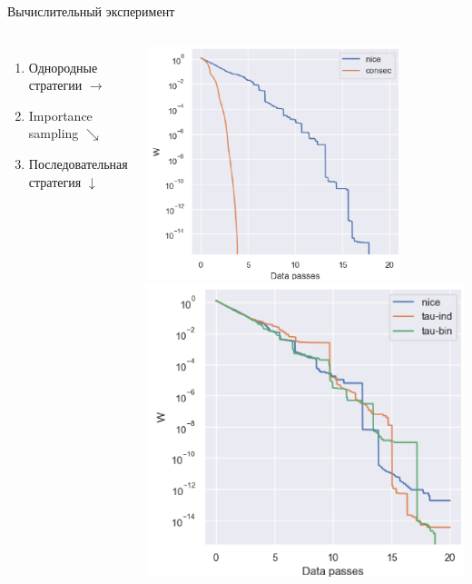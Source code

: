 \documentclass{beamer}
\begin{document}
\begin{frame}{Вычислительный эксперимент}

\begin{columns}[c]
		\begin{enumerate}
			\item Однородные стратегии $\rightarrow$
			\item Importance sampling $\searrow$
			\item Последовательная стратегия $\downarrow$
		\end{enumerate}
		\includegraphics[width=0.8\textwidth]{consecutive strategy 10}
		\includegraphics[width=\textwidth]{uniform strategies}

\end{columns}
\end{frame}
\end{document}
